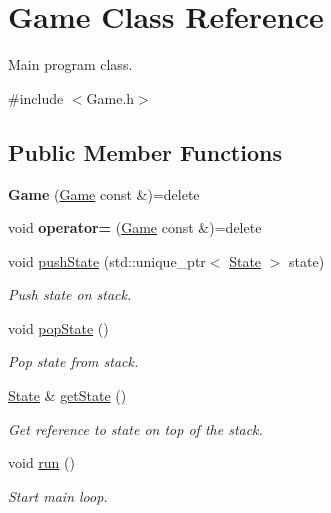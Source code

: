\hypertarget{classGame}{\section{Game Class Reference}
\label{classGame}
}


Main program class.  




{\ttfamily \#include $<$Game.\-h$>$}

\subsection*{Public Member Functions}
\begin{DoxyCompactItemize}
\item 
\hypertarget{classGame_a586a831ed5ff1283fcf1b96f4eff065c}{{\bfseries Game} (\hyperlink{classGame}{Game} const \&)=delete}\label{classGame_a586a831ed5ff1283fcf1b96f4eff065c}

\item 
\hypertarget{classGame_aa4c0eacd8656e54ec4e94877c453e531}{void {\bfseries operator=} (\hyperlink{classGame}{Game} const \&)=delete}\label{classGame_aa4c0eacd8656e54ec4e94877c453e531}

\item 
\hypertarget{classGame_aa808b50e4c19c3ca8907d6a3ab1f473e}{void \hyperlink{classGame_aa808b50e4c19c3ca8907d6a3ab1f473e}{push\-State} (std\-::unique\-\_\-ptr$<$ \hyperlink{classState}{State} $>$ state)}\label{classGame_aa808b50e4c19c3ca8907d6a3ab1f473e}

\begin{DoxyCompactList}\small\item\em Push state on stack. \end{DoxyCompactList}\item 
\hypertarget{classGame_a4b33dd67adef59bebadba8a234282c88}{void \hyperlink{classGame_a4b33dd67adef59bebadba8a234282c88}{pop\-State} ()}\label{classGame_a4b33dd67adef59bebadba8a234282c88}

\begin{DoxyCompactList}\small\item\em Pop state from stack. \end{DoxyCompactList}\item 
\hypertarget{classGame_aa742f626e4b8a5dac8677ef40263716c}{\hyperlink{classState}{State} \& \hyperlink{classGame_aa742f626e4b8a5dac8677ef40263716c}{get\-State} ()}\label{classGame_aa742f626e4b8a5dac8677ef40263716c}

\begin{DoxyCompactList}\small\item\em Get reference to state on top of the stack. \end{DoxyCompactList}\item 
\hypertarget{classGame_a1ab78f5ed0d5ea879157357cf2fb2afa}{void \hyperlink{classGame_a1ab78f5ed0d5ea879157357cf2fb2afa}{run} ()}\label{classGame_a1ab78f5ed0d5ea879157357cf2fb2afa}

\begin{DoxyCompactList}\small\item\em Start main loop. \end{DoxyCompactList}\end{DoxyCompactItemize}
